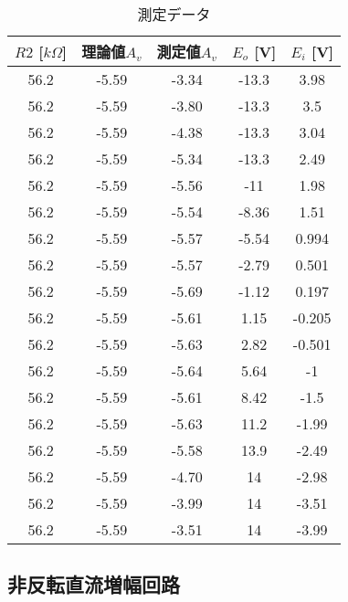 \documentclass[a4paper,11pt,xelatex,ja=standard]{bxjsarticle}
\begin{document}
        \begin{table}[htbp]
            \centering
            \caption{測定データ}
            \begin{tabular}{|c|c|c|c|c|}
                \hline
                $R2$ [$k\Omega$] & 理論値$A_v$ & 測定値$A_v$ & $E_o$ [V] & $E_i$ [V] \\
                \hline
                56.2 & -5.59 & -3.34 & -13.3 & 3.98 \\
                56.2 & -5.59 & -3.80 & -13.3 & 3.5 \\
                56.2 & -5.59 & -4.38 & -13.3 & 3.04 \\
                56.2 & -5.59 & -5.34 & -13.3 & 2.49 \\
                56.2 & -5.59 & -5.56 & -11 & 1.98 \\
                56.2 & -5.59 & -5.54 & -8.36 & 1.51 \\
                56.2 & -5.59 & -5.57 & -5.54 & 0.994 \\
                56.2 & -5.59 & -5.57 & -2.79 & 0.501 \\
                56.2 & -5.59 & -5.69 & -1.12 & 0.197 \\
                56.2 & -5.59 & -5.61 & 1.15 & -0.205 \\
                56.2 & -5.59 & -5.63 & 2.82 & -0.501 \\
                56.2 & -5.59 & -5.64 & 5.64 & -1 \\
                56.2 & -5.59 & -5.61 & 8.42 & -1.5 \\
                56.2 & -5.59 & -5.63 & 11.2 & -1.99 \\
                56.2 & -5.59 & -5.58 & 13.9 & -2.49 \\
                56.2 & -5.59 & -4.70 & 14 & -2.98 \\
                56.2 & -5.59 & -3.99 & 14 & -3.51 \\
                56.2 & -5.59 & -3.51 & 14 & -3.99 \\
                \hline
            \end{tabular}
            \label{tab:mytable2}
        \end{table}

        \subsection{非反転直流増幅回路}
\end{document}
